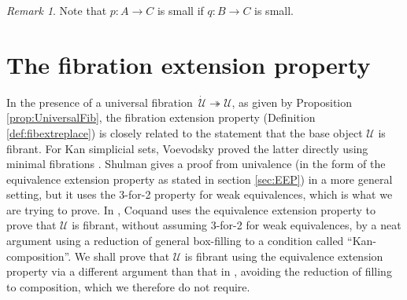 \documentclass[12pt]{article}
\newcommand{\ednote}[1]{[\textit{\color{red}{#1}}]} %
\newcommand{\ra}{\ensuremath{\rightarrow}}
\newcommand{\fib}{\ensuremath{\twoheadrightarrow}}
\newcommand{\I}{\ensuremath{\mathrm{I}}}
\newcommand{\U}{\ensuremath{\mathcal{U}}}
\newcommand{\UU}{\ensuremath{\,\dot{\mathcal{U}}}}
\theoremstyle{remark}
\newtheorem{remark}[theorem]{Remark}
\theoremstyle{definition}
\begin{document}
\begin{remark}
Note that $p : A \ra C$ is small if $q : B\ra C$ is small.
\end{remark}


\section{The fibration extension property}\label{sec:FEP}

In the presence of a universal fibration $\UU\fib\U$, as given by Proposition \ref{prop:UniversalFib}, the fibration extension property (Definition \ref{def:fibextreplace})  is closely related to the statement that the base object $\U$ is fibrant.  For Kan simplicial sets, Voevodsky proved the latter directly using minimal fibrations \cite{VVuniverse}.  Shulman \cite{Shulmanuniverse} gives a proof from univalence (in the form of the equivalence extension property as stated in section \ref{sec:EEP}) in a more general setting, but it uses the 3-for-2 property for weak equivalences, which is what we are trying to prove. In \cite{CCHM}, Coquand uses the equivalence extension property to prove that $\U$ is fibrant, without assuming 3-for-2 for weak equivalences, by a neat argument using a reduction of general box-filling to a condition called ``Kan-composition''.   We shall prove that $\U$ is fibrant using the equivalence extension property via a different argument than that in \cite{CCHM}, avoiding the reduction of filling to composition, which we therefore do not require.
\end{document}
